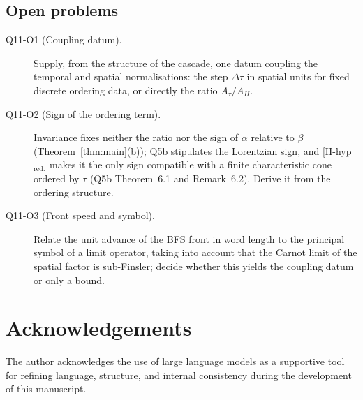 \documentclass[12pt,a4paper]{article}
\begin{document}
    \subsection{Open problems}

      \begin{description}
        \item[Q11-O1 (Coupling datum).]
        Supply, from the structure of the cascade, one datum coupling the temporal and spatial normalisations: the step
        $\Delta\tau$ in spatial units for fixed discrete ordering data, or directly the ratio $A_\tau/A_H$.
        \item[Q11-O2 (Sign of the ordering term).]
        Invariance fixes neither the ratio nor the sign of $\alpha$ relative to $\beta$
        (Theorem~\ref{thm:main}(b)); Q5b stipulates the Lorentzian sign, and [H-hyp$_{\mathrm{red}}$] makes it the only
        sign compatible with a finite characteristic cone ordered by $\tau$ (Q5b Theorem~6.1 and Remark~6.2).
        Derive it from the ordering structure.
        \item[Q11-O3 (Front speed and symbol).]
        Relate the unit advance of the BFS front in word length to the principal symbol of a limit operator, taking into
        account that the Carnot limit of the spatial factor is sub-Finsler; decide whether this yields the coupling
        datum or only a bound.
      \end{description}

      \newpage
  \section*{Acknowledgements}

    The author acknowledges the use of large language models as a supportive tool for refining
    language, structure, and internal consistency during the development of this manuscript.

    
    
\end{document}
